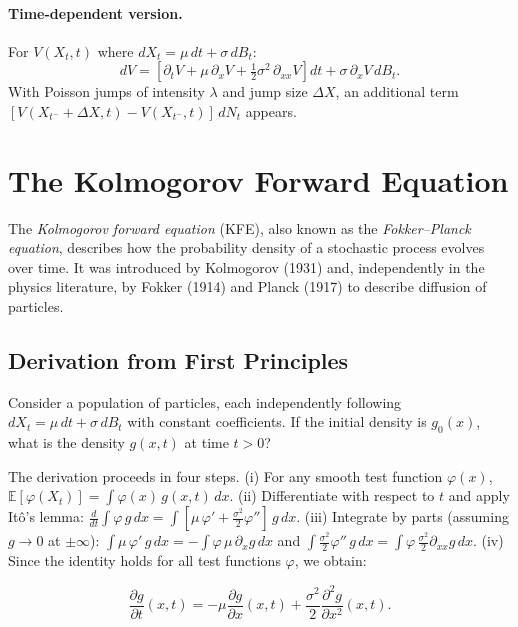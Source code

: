 \documentclass[11pt,a4paper]{report}
\newcommand{\E}[1]{\mathbb{E}\!\left[#1\right]}
\begin{document}
\paragraph{Time-dependent version.}  For $V(X_t, t)$ where $dX_t = \mu\,dt + \sigma\,dB_t$:
\begin{equation}
dV = \left[\partial_t V + \mu\,\partial_x V + \tfrac{1}{2}\sigma^2\,\partial_{xx} V\right]dt + \sigma\,\partial_x V\,dB_t.
\label{eq:ito_multi}
\end{equation}
With Poisson jumps of intensity $\lambda$ and jump size $\Delta X$, an additional term $[V(X_{t^-} + \Delta X, t) - V(X_{t^-}, t)]\,dN_t$ appears.

\section{The Kolmogorov Forward Equation}
\label{sec:kfe_theory}

The \emph{Kolmogorov forward equation} (KFE), also known as the \emph{Fokker--Planck equation}, describes how the probability density of a stochastic process evolves over time.  It was introduced by Kolmogorov (1931) and, independently in the physics literature, by Fokker (1914) and Planck (1917) to describe diffusion of particles.

\subsection{Derivation from First Principles}

Consider a population of particles, each independently following $dX_t = \mu\,dt + \sigma\,dB_t$ with constant coefficients.  If the initial density is $g_0(x)$, what is the density $g(x,t)$ at time $t > 0$?

The derivation proceeds in four steps.  (i) For any smooth test function $\varphi(x)$, $\E{\varphi(X_t)} = \int \varphi(x)\,g(x,t)\,dx$.  (ii) Differentiate with respect to $t$ and apply It\^o's lemma: $\tfrac{d}{dt}\int \varphi\,g\,dx = \int [\mu\,\varphi' + \tfrac{\sigma^2}{2}\varphi'']\,g\,dx$.  (iii) Integrate by parts (assuming $g \to 0$ at $\pm\infty$): $\int \mu\,\varphi'\,g\,dx = -\int \varphi\,\mu\,\partial_x g\,dx$ and $\int \tfrac{\sigma^2}{2}\varphi''\,g\,dx = \int \varphi\,\tfrac{\sigma^2}{2}\partial_{xx}g\,dx$.  (iv) Since the identity holds for all test functions $\varphi$, we obtain:

\begin{equation}
\boxed{\frac{\partial g}{\partial t}(x,t) = -\mu\frac{\partial g}{\partial x}(x,t) + \frac{\sigma^2}{2}\frac{\partial^2 g}{\partial x^2}(x,t).}
\label{eq:kfe_const}
\end{equation}
\end{document}
